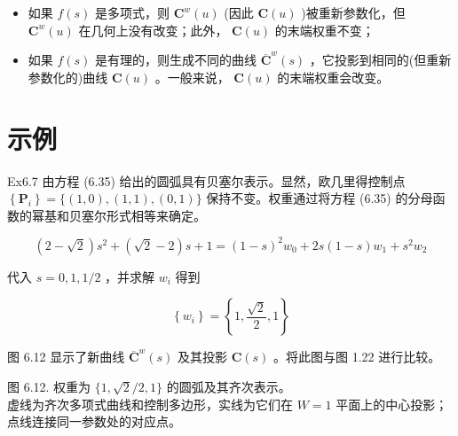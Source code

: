 \documentclass[../main.tex]{subfiles}
\begin{document}
\begin{itemize}
\item 如果 \(f\left( s\right)\) 是多项式，则 \({\mathbf{C}}^{w}\left( u\right)\) (因此 \(\mathbf{C}\left( u\right)\) )被重新参数化，但 \({\mathbf{C}}^{w}\left( u\right)\) 在几何上没有改变；此外， \(\mathbf{C}\left( u\right)\) 的末端权重不变；
\end{itemize}

\begin{itemize}
\item 如果 \(f\left( s\right)\) 是有理的，则生成不同的曲线 \({\overline{\mathbf{C}}}^{w}\left( s\right)\) ，它投影到相同的(但重新参数化的)曲线 \(\mathbf{C}\left( u\right)\) 。一般来说， \(\mathbf{C}\left( u\right)\) 的末端权重会改变。
\end{itemize}

\section*{示例}

Ex6.7 由方程 (6.35) 给出的圆弧具有贝塞尔表示。显然，欧几里得控制点 \(\left\{  {\mathbf{P}}_{i}\right\}   = \{ \left( {1,0}\right) ,\left( {1,1}\right) ,\left( {0,1}\right) \}\) 保持不变。权重通过将方程 (6.35) 的分母函数的幂基和贝塞尔形式相等来确定。

\[
\left( {2 - \sqrt{2}}\right) {s}^{2} + \left( {\sqrt{2} - 2}\right) s + 1 = {\left( 1 - s\right) }^{2}{w}_{0} + {2s}\left( {1 - s}\right) {w}_{1} + {s}^{2}{w}_{2}
\]

代入 \(s = 0,1,1/2\) ，并求解 \({w}_{i}\) 得到

\[
\left\{  {w}_{i}\right\}   = \left\{  {1,\frac{\sqrt{2}}{2},1}\right\}   \tag{6.55}
\]

图 6.12 显示了新曲线 \({\overline{\mathbf{C}}}^{w}\left( s\right)\) 及其投影 \(\mathbf{C}\left( s\right)\) 。将此图与图 1.22 进行比较。

\begin{center}
\begin{minipage}{22cm}
\vspace*{.6\baselineskip}
\centering
{}
\par\smallskip
图 6.12. 权重为 $\{1,\sqrt2/2,1\}$ 的圆弧及其齐次表示。\\
虚线为齐次多项式曲线和控制多边形，实线为它们在 $W=1$ 平面上的中心投影；点线连接同一参数处的对应点。
\end{minipage}
\end{center}
\end{document}
